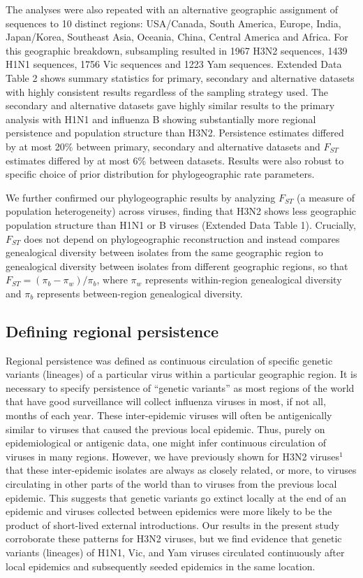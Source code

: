 \documentclass[11pt,oneside,letterpaper]{article}
\begin{document}
The analyses were also repeated with an alternative geographic assignment of sequences to 10 distinct regions: USA/Canada, South America, Europe, India, Japan/Korea, Southeast Asia, Oceania, China, Central America and Africa.
For this geographic breakdown, subsampling resulted in 1967 H3N2 sequences, 1439 H1N1 sequences, 1756 Vic sequences and 1223 Yam sequences.
Extended Data Table 2 shows summary statistics for primary, secondary and alternative datasets with highly consistent results regardless of the sampling strategy used.
The secondary and alternative datasets gave highly similar results to the primary analysis with H1N1 and influenza B showing substantially more regional persistence and population structure than H3N2.
Persistence estimates differed by at most 20\% between primary, secondary and alternative datasets and $F_{ST}$ estimates differed by at most 6\% between datasets.
Results were also robust to specific choice of prior distribution for phylogeographic rate parameters.

We further confirmed our phylogeographic results by analyzing $F_{ST}$ (a measure of population heterogeneity\cite{Weir84}) across viruses, finding that H3N2 shows less geographic population structure than H1N1 or B viruses (Extended Data Table 1).
Crucially, $F_{ST}$ does not depend on phylogeographic reconstruction and instead compares genealogical diversity between isolates from the same geographic region to genealogical diversity between isolates from different geographic regions, so that $F_{ST} = (\pi_b - \pi_w) / \pi_b$, where $\pi_w$ represents within-region genealogical diversity and $\pi_b$ represents between-region genealogical diversity.

\subsection*{Defining regional persistence}

Regional persistence was defined as continuous circulation of specific genetic variants (lineages) of a particular virus within a particular geographic region.
It is necessary to specify persistence of ``genetic variants'' as most regions of the world that have good surveillance will collect influenza viruses in most, if not all, months of each year.
These inter-epidemic viruses will often be antigenically similar to viruses that caused the previous local epidemic.
Thus, purely on epidemiological or antigenic data, one might infer continuous circulation of viruses in many regions.
However, we have previously shown for H3N2 viruses$^1$ that these inter-epidemic isolates are always as closely related, or more, to viruses circulating in other parts of the world than to viruses from the previous local epidemic.
This suggests that genetic variants go extinct locally at the end of an epidemic and viruses collected between epidemics were more likely to be the product of short-lived external introductions.
Our results in the present study corroborate these patterns for H3N2 viruses, but we find evidence that genetic variants (lineages) of H1N1, Vic, and Yam viruses circulated continuously after local epidemics and subsequently seeded epidemics in the same location.
\end{document}
